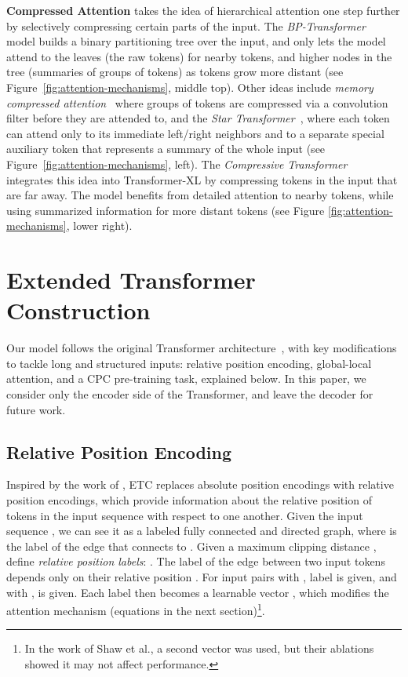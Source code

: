 \documentclass[11pt,a4paper]{article}
\begin{document}
{\bf Compressed Attention} takes the idea of hierarchical attention one step further by selectively compressing certain parts of the input. The {\em BP-Transformer}~\cite{ye2019bp} model builds a binary partitioning tree over the input, and only lets the model attend to the leaves (the raw tokens) for nearby tokens, and higher nodes in the tree (summaries of groups of tokens) as tokens grow more distant (see Figure~\ref{fig:attention-mechanisms}, middle top). Other ideas include {\em memory compressed attention}~\cite{liu2018generating} where groups of  tokens are compressed via a convolution filter before they are attended to, and the {\em Star Transformer}~\cite{guo2019star}, where each token can attend only to its immediate left/right neighbors and to a separate special auxiliary token that represents a summary of the whole input (see Figure~\ref{fig:attention-mechanisms}, left).
The {\em Compressive Transformer}~\cite{rae2019compressive} integrates this idea into Transformer-XL by compressing tokens in the input that are far away. The model benefits from detailed attention to nearby tokens, while using summarized information for more distant tokens (see Figure \ref{fig:attention-mechanisms}, lower right). 







\section{Extended Transformer Construction}\label{sec:etc}

Our model follows the original Transformer architecture~\cite{vaswani2017attention}, with key modifications to tackle long and structured inputs: relative position encoding, global-local attention, and a CPC pre-training task, explained below. In this paper, we consider only the encoder side of the Transformer, and leave the decoder for future work.




\subsection{Relative Position Encoding}\label{sec:relativepe}

Inspired by the work of \citet{shaw2018self}, ETC replaces absolute position encodings with relative position encodings, which provide information about the relative position of tokens in the input sequence with respect to one another. Given the input sequence , we can see it as a labeled fully connected and directed graph, where  is the label of the edge that connects  to . Given a maximum clipping distance , \citeauthor{shaw2018self} define  {\em relative position labels}: . The label of the edge between two input tokens depends only on their relative position . For input pairs with , label  is given, and with ,  is given. Each label then becomes a learnable vector , which modifies the attention mechanism (equations in the next section)\footnote{In the work of Shaw et al., a second  vector was used, but their ablations showed it may not affect performance.}.
\end{document}
